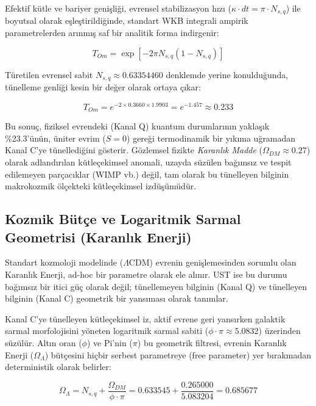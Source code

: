 \documentclass[12pt,a4paper]{article}
\begin{document}
Efektif kütle ve bariyer genişliği, evrensel stabilizasyon hızı ($\kappa \cdot dt = \pi \cdot N_{s,q}$) ile boyutsal olarak eşleştirildiğinde, standart WKB integrali ampirik parametrelerden arınmış saf bir analitik forma indirgenir:

\begin{equation}
T_{Om} = \exp\left[-2\pi N_{s,q}(1 - N_{s,q})\right]
\end{equation}

Türetilen evrensel sabit $N_{s,q} \approx 0.63354460$ denklemde yerine konulduğunda, tünelleme genliği kesin bir değer olarak ortaya çıkar:

\begin{equation}
T_{Om} = e^{-2 \times 0.3660 \times 1.9903} = e^{-1.457} \approx 0.233
\end{equation}

Bu sonuç, fiziksel evrendeki (Kanal Q) kuantum durumlarının yaklaşık \%23.3'ünün, üniter evrim ($S = 0$) gereği termodinamik bir yıkıma uğramadan Kanal C'ye tünellediğini gösterir. Gözlemsel fizikte \textit{Karanlık Madde} ($\Omega_{DM} \approx 0.27$) olarak adlandırılan kütleçekimsel anomali, uzayda süzülen bağımsız ve tespit edilemeyen parçacıklar (WIMP vb.) değil, tam olarak bu tünelleyen bilginin makrokozmik ölçekteki kütleçekimsel izdüşümüdür.

\subsection{Kozmik Bütçe ve Logaritmik Sarmal Geometrisi (Karanlık Enerji)}
Standart kozmoloji modelinde ($\Lambda$CDM) evrenin genişlemesinden sorumlu olan Karanlık Enerji, ad-hoc bir parametre olarak ele alınır. UST ise bu durumu bağımsız bir itici güç olarak değil; tünellemeyen bilginin (Kanal Q) ve tünelleyen bilginin (Kanal C) geometrik bir yansıması olarak tanımlar.

Kanal C'ye tünelleyen kütleçekimsel iz, aktif evrene geri yansırken galaktik sarmal morfolojisini yöneten logaritmik sarmal sabiti ($\phi \cdot \pi \approx 5.0832$) üzerinden süzülür. Altın oran ($\phi$) ve Pi'nin ($\pi$) bu geometrik filtresi, evrenin Karanlık Enerji ($\Omega_\Lambda$) bütçesini hiçbir serbest parametreye (free parameter) yer bırakmadan deterministik olarak belirler:

\begin{equation}
\Omega_\Lambda = N_{s,q} + \frac{\Omega_{DM}}{\phi \cdot \pi} = 0.633545 + \frac{0.265000}{5.083204} = 0.685677
\end{equation}
\end{document}
